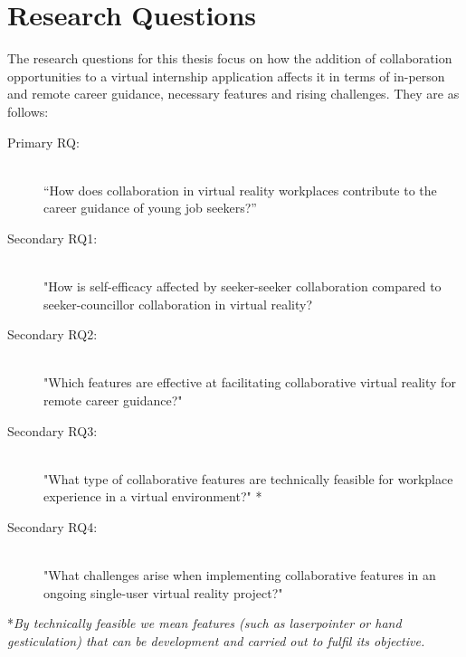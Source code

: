 \section{Research Questions}
The research questions for this thesis focus on how the addition of collaboration opportunities to a virtual internship application affects it in terms of in-person and remote career guidance, necessary features and rising challenges. They are as follows:
\label{RQ}
\begin{description}
    \item [Primary RQ:]\hfill \\
    “How does collaboration in virtual reality workplaces contribute to the career guidance of young job seekers?” 
    \item [Secondary RQ1:]\hfill \\
    "How is self-efficacy affected by seeker-seeker collaboration compared to seeker-councillor collaboration in virtual reality?
    \item [Secondary RQ2:]\hfill \\
    "Which features are effective at facilitating collaborative virtual reality for remote career guidance?"
    \item [Secondary RQ3:]\hfill \\
    "What type of collaborative features are technically feasible for workplace experience in a virtual environment?" *
    \item  [Secondary RQ4:]\hfill \\
    "What challenges arise when implementing collaborative features in an ongoing single-user virtual reality project?"
    
\end{description}

\vspace{2cm}
*\textit{By technically feasible we mean features (such as laserpointer or hand gesticulation) that can be development and carried out to fulfil its objective. }


\cleardoublepage
